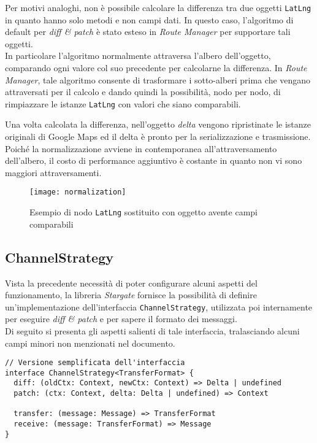 Per motivi analoghi, non è possibile calcolare la differenza tra due oggetti \texttt{LatLng} in quanto hanno solo metodi e non campi dati. In questo caso, l'algoritmo di default per \textit{diff \& patch} è stato esteso in \textit{Route Manager} per supportare tali oggetti. \\

In particolare l'algoritmo normalmente attraversa l'albero dell'oggetto, comparando ogni valore col suo precedente per calcolarne la differenza. In \textit{Route Manager}, tale algoritmo consente di trasformare i sotto-alberi prima che vengano attraversati per il calcolo e dando quindi la possibilità, nodo per nodo, di rimpiazzare le istanze \texttt{LatLng} con valori che siano comparabili. 

Una volta calcolata la differenza, nell'oggetto \textit{delta} vengono ripristinate le istanze originali di Google Maps ed il delta è pronto per la serializzazione e trasmissione. \\

Poiché la normalizzazione avviene in contemporanea all'attraversamento dell'albero, il costo di performance aggiuntivo è costante in quanto non vi sono maggiori attraversamenti.

\begin{figure}[H] 
  \centering 
  \texttt{[image: normalization]} 
  \caption{Esempio di nodo \texttt{LatLng} sostituito con oggetto avente campi comparabili}
\end{figure}

\subsection{ChannelStrategy}

Vista la precedente necessità di poter configurare alcuni aspetti del funzionamento, la libreria \textit{Stargate} fornisce la possibilità di definire un'implementazione dell'interfaccia \texttt{ChannelStrategy}, utilizzata poi internamente per eseguire \textit{diff \& patch} e per sapere il formato dei messaggi. \\

Di seguito si presenta gli aspetti salienti di tale interfaccia, tralasciando alcuni campi minori non menzionati nel documento. \\

\begin{lstlisting}[language={[Sharp]C},basicstyle=\footnotesize]
// Versione semplificata dell'interfaccia
interface ChannelStrategy<TransferFormat> {
  diff: (oldCtx: Context, newCtx: Context) => Delta | undefined
  patch: (ctx: Context, delta: Delta | undefined) => Context

  transfer: (message: Message) => TransferFormat
  receive: (message: TransferFormat) => Message
}
\end{lstlisting}

